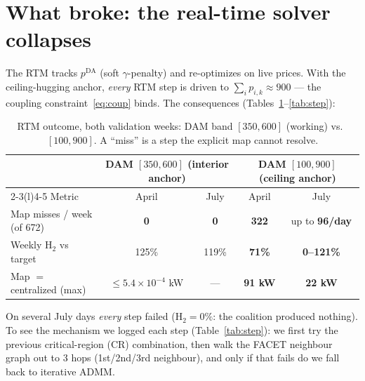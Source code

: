 \documentclass[11pt, letterpaper]{article}
\begin{document}
\section{What broke: the real-time solver collapses}
The RTM tracks $p^{\mathrm{DA}}$ (soft $\gamma$-penalty) and re-optimizes on live prices. With the
ceiling-hugging anchor, \emph{every} RTM step is driven to $\sum_i p_{i,k}\approx900$ --- the
coupling constraint~\eqref{eq:coup} binds. The consequences (Tables~\ref{tab:before}--\ref{tab:step}):

\begin{table}[H]\centering\small
\caption{RTM outcome, both validation weeks: DAM band $[350,600]$ (working) vs.\ $[100,900]$.
A ``miss'' is a step the explicit map cannot resolve.}
\label{tab:before}
\begin{tabular}{l cc cc}
\toprule
& \multicolumn{2}{c}{DAM $[350,600]$ (interior anchor)} & \multicolumn{2}{c}{DAM $[100,900]$ (ceiling anchor)}\\
\cmidrule(lr){2-3}\cmidrule(l){4-5}
Metric & April & July & April & July\\
\midrule
Map misses / week (of 672) & \textbf{0} & \textbf{0} & \textbf{322} & up to \textbf{96/day}\\
Weekly H$_2$ vs target & 125\% & 119\% & \textbf{71\%} & \textbf{0--121\%}\\
Map $=$ centralized (max) & $\le5.4\!\times\!10^{-4}$ kW & --- & \textbf{91 kW} & \textbf{22 kW}\\
\bottomrule
\end{tabular}
\end{table}

On several July days \emph{every} step failed (H$_2=0\%$: the coalition produced nothing). To see
the mechanism we logged each step (Table~\ref{tab:step}): we first try the previous critical-region
(CR) combination, then walk the FACET neighbour graph out to 3 hops (1st/2nd/3rd neighbour), and
only if that fails do we fall back to iterative ADMM.
\end{document}
